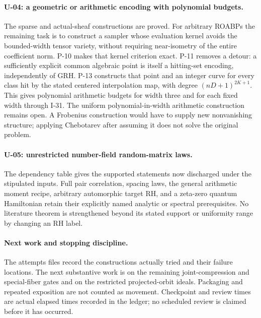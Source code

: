 \paragraph{U-04: a geometric or arithmetic encoding with polynomial budgets.}
The sparse and actual-sheaf constructions are proved. For arbitrary ROABPs the remaining task is to construct a sampler whose evaluation kernel avoids the bounded-width tensor variety, without requiring near-isometry of the entire coefficient norm. P-10 makes that kernel criterion exact. P-11 removes a detour: a sufficiently explicit common algebraic point is itself a hitting-set encoding, independently of GRH. P-13 constructs that point and an integer curve for every class hit by the stated centered interpolation map, with degree $(nD+1)^{2K+1}$. This gives polynomial arithmetic budgets for width three and for each fixed width through I-31. The uniform polynomial-in-width arithmetic construction remains open. A Frobenius construction would have to supply new nonvanishing structure; applying Chebotarev after assuming it does not solve the original problem.

\paragraph{U-05: unrestricted number-field random-matrix laws.}
The dependency table gives the supported statements now discharged under the stipulated inputs. Full pair correlation, spacing laws, the general arithmetic moment recipe, arbitrary automorphic target RH, and a zeta-zero quantum Hamiltonian retain their explicitly named analytic or spectral prerequisites. No literature theorem is strengthened beyond its stated support or uniformity range by changing an RH label.

\paragraph{Next work and stopping discipline.}
The attempts files record the constructions actually tried and their failure locations. The next substantive work is on the remaining joint-compression and special-fiber gates and on the restricted projected-orbit ideals. Packaging and repeated exposition are not counted as movement. Checkpoint and review times are actual elapsed times recorded in the ledger; no scheduled review is claimed before it has occurred.
